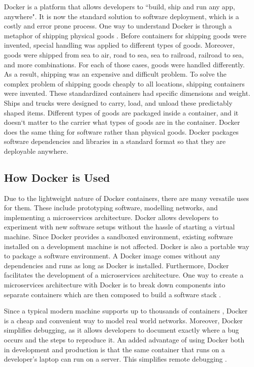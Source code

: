 \documentclass[11pt]{article}
\begin{document}
	Docker is a platform that allows developers to ``build, ship and run any app, anywhere". It is now the standard solution to software deployment, which is a costly and error prone process. One way to understand Docker is through a metaphor of shipping physical goods \cite{miell}. Before containers for shipping goods were invented, special handling was applied to different types of goods. Moreover, goods were shipped from sea to air, road to sea, sea to railroad, railroad to sea, and more combinations. For each of those cases, goods were handled differently. As a result, shipping was an expensive and difficult problem. To solve the complex problem of shipping goods cheaply to all locations, shipping containers were invented. These standardized containers had specific dimensions and weight. Ships and trucks were designed to carry, load, and unload these predictably shaped items. Different types of goods are packaged inside a container, and it doesn`t matter to the carrier what types of goods are in the container. Docker does the same thing for software rather than physical goods. Docker packages software dependencies and libraries in a standard format so that they are deployable anywhere.
	
	\subsection{How Docker is Used}
	Due to the lightweight nature of Docker containers, there are many versatile uses for them. These include prototyping software, modelling networks, and implementing a microservices architecture. Docker allows developers to experiment with new software setups without the hassle of starting a virtual machine. Since Docker provides a sandboxed environment, existing software installed on a development machine is not affected. Docker is also a portable way to package a software environment. A Docker image comes without any dependencies and runs as long as Docker is installed. Furthermore, Docker facilitates the development of a microservices architecture. One way to create a microservices architecture with Docker is to break down components into separate containers which are then composed to build a software stack \cite{miell}.
	
	Since a typical modern machine supports up to thousands of containers \cite{pahl}, Docker is a cheap and convenient way to model real world networks. Moreover, Docker simplifies debugging, as it allows developers to document exactly where a bug occurs and the steps to reproduce it. An added advantage of using Docker both in development and production is that the same container that runs on a developer’s laptop can run on a server. This simplifies remote debugging \cite{miell}.
	
\end{document}
